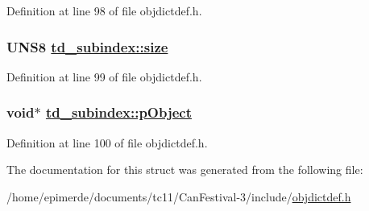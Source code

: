 Definition at line 98 of file objdictdef.h.\hypertarget{structtd__subindex_660ca8ed5b240340229cfd07c6700d1b}{
\subsubsection[size]{\setlength{\rightskip}{0pt plus 5cm}UNS8 \hyperlink{structtd__subindex_660ca8ed5b240340229cfd07c6700d1b}{td\_\-subindex::size}}}
\label{structtd__subindex_660ca8ed5b240340229cfd07c6700d1b}




Definition at line 99 of file objdictdef.h.\hypertarget{structtd__subindex_6c83d4e45acd437dcd6746fcf9b7495a}{
\subsubsection[pObject]{\setlength{\rightskip}{0pt plus 5cm}void$\ast$ \hyperlink{structtd__subindex_6c83d4e45acd437dcd6746fcf9b7495a}{td\_\-subindex::p\-Object}}}
\label{structtd__subindex_6c83d4e45acd437dcd6746fcf9b7495a}




Definition at line 100 of file objdictdef.h.

The documentation for this struct was generated from the following file:\begin{CompactItemize}
\item 
/home/epimerde/documents/tc11/Can\-Festival-3/include/\hyperlink{objdictdef_8h}{objdictdef.h}\end{CompactItemize}
